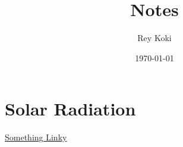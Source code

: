 \documentclass[10pt]{article}
\title{Notes}
\author{Rey Koki}
\date{\today}
\begin{document}
\maketitle \tableofcontents

\section{Solar Radiation}

\href{http://www.overleaf.com}{Something Linky} 
\end{document}
